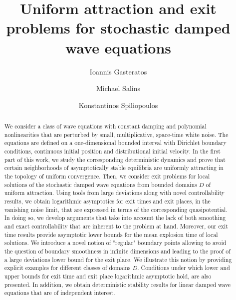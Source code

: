 \documentclass[10pt, reqno]{amsart}
\title{Uniform attraction and exit problems for stochastic damped wave equations}
\author{Ioannis Gasteratos}
\author{Michael Salins}
\author{Konstantinos Spiliopoulos}
\theoremstyle{definition}
\numberwithin{lem}{section}
\numberwithin{cor}{section}
\numberwithin{prop}{section}
\numberwithin{thm}{section}
\numberwithin{dfn}{section}
\begin{document}
\begin{abstract} We consider a class of wave equations with constant damping and polynomial nonlinearities that are perturbed by small, multiplicative, space-time white noise. The equations are defined on a one-dimensional bounded interval with Dirichlet boundary conditions, continuous initial position and distributional initial velocity. In the first part of this work, we study the corresponding deterministic dynamics and prove that certain neighborhoods of asymptotically stable equilibria are uniformly attracting in the topology of uniform convergence. Then, we consider exit problems for local solutions of the stochastic damped wave equations from bounded domains $D$ of uniform attraction. Using tools from large deviations along with novel controllability results, we obtain logarithmic asymptotics for exit times and exit places, in the vanishing noise limit, that are expressed in terms of the corresponding quasipotential. In doing so, we develop arguments that take into account the lack of both smoothing and exact controllability that are inherent to the problem at hand. Moreover, our exit time results provide asymptotic lower bounds for the mean explosion time of local solutions.  We introduce a novel notion of "regular" boundary points allowing to avoid the question of boundary smoothness in infinite dimensions and leading to the proof of a large deviations lower bound for the exit place.  We illustrate this notion by providing explicit examples for different classes of domains $D$. Conditions under which lower and upper bounds for exit time and exit place logarithmic asymptotic hold, are also presented.  In addition, we obtain deterministic stability results for linear damped wave equations that are of independent interest.    
 \end{abstract}









	\maketitle 
 



 
\end{document}
